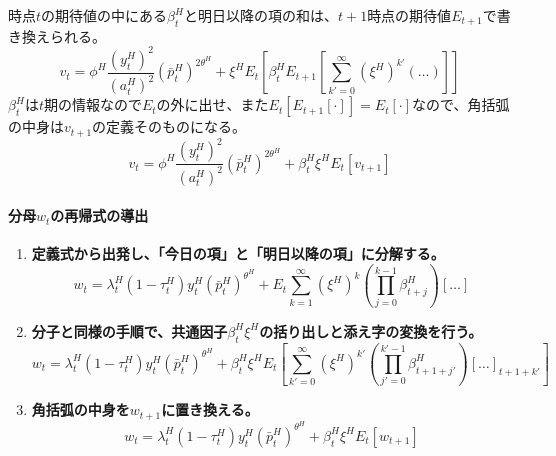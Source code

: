 \begin{enumerate}
    時点\(t\)の期待値の中にある\(\beta_t^H\)と明日以降の項の和は、\(t+1\)時点の期待値\(E_{t+1}\)で書き換えられる。
    \begin{equation}
    v_t=\phi^H\frac{(y_t^H)^2}{(a_t^H)^2}(\bar{p}_t^H)^{2\theta^H}+\xi^HE_t\left[\beta_t^HE_{t+1}\left[\sum_{k'=0}^{\infty}(\xi^H)^{k'}\left(\dots\right)\right]\right]
    \label{eq:appendix_optimal_price_derivation_foc_sub4_v_lie}
    \end{equation}
    \(\beta_t^H\)は\(t\)期の情報なので\(E_t\)の外に出せ、また\(E_t[E_{t+1}[\cdot]]=E_t[\cdot]\)なので、角括弧の中身は\(v_{t+1}\)の定義そのものになる。
    \begin{equation}
    v_t=\phi^H\frac{(y_t^H)^2}{(a_t^H)^2}(\bar{p}_t^H)^{2\theta^H}+\beta_t^H\xi^HE_t[v_{t+1}]
    \label{eq:appendix_optimal_price_derivation_foc_sub4_v_recursive}
    \end{equation}
\end{enumerate}

\paragraph{分母\(w_t\)の再帰式の導出}
\label{sec:appendix_optimal_price_derivation_foc_sub4_w_deriv}

\begin{enumerate}
    \item\label{itm:appendix_optimal_price_derivation_foc_sub4_w_step1} \textbf{定義式から出発し、「今日の項」と「明日以降の項」に分解する。}
    \begin{equation}
    w_t=\lambda_t^H(1-\tau_t^H)y_t^H(\bar{p}_t^H)^{\theta^H}+E_t\sum_{k=1}^{\infty}(\xi^H)^k\left(\prod_{j=0}^{k-1}\beta_{t+j}^H\right)\left[\dots\right]
    \label{eq:appendix_optimal_price_derivation_foc_sub4_w_decomp}
    \end{equation}
    \item\label{itm:appendix_optimal_price_derivation_foc_sub4_w_step2} \textbf{分子と同様の手順で、共通因子\(\beta_t^H\xi^H\)の括り出しと添え字の変換を行う。}
    \begin{equation}
    w_t=\lambda_t^H(1-\tau_t^H)y_t^H(\bar{p}_t^H)^{\theta^H}+\beta_t^H\xi^HE_t\left[\sum_{k'=0}^{\infty}(\xi^H)^{k'}\left(\prod_{j'=0}^{k'-1}\beta_{t+1+j'}^H\right)\left[\dots\right]_{t+1+k'}\right]
    \label{eq:appendix_optimal_price_derivation_foc_sub4_w_recursive_step}
    \end{equation}
    \item\label{itm:appendix_optimal_price_derivation_foc_sub4_w_step3} \textbf{角括弧の中身を\(w_{t+1}\)に置き換える。}
    \begin{equation}
    w_t=\lambda_t^H(1-\tau_t^H)y_t^H(\bar{p}_t^H)^{\theta^H}+\beta_t^H\xi^HE_t[w_{t+1}]
    \label{eq:appendix_optimal_price_derivation_foc_sub4_w_recursive}
    \end{equation}
\end{enumerate}

